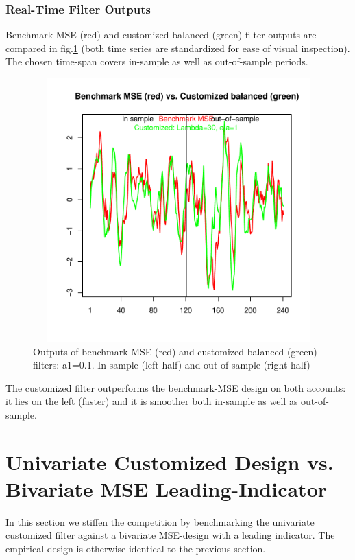 \documentclass[a4paper]{book}
\begin{document}
\subsubsection{Real-Time Filter Outputs}


Benchmark-MSE (red) and customized-balanced (green) filter-outputs are compared in fig.\ref{z_dfa_cust_ats_mba_per_e} (both time series are standardized for ease of visual inspection). The chosen time-span covers in-sample as well as out-of-sample periods. 

\begin{figure}[H]\begin{center}\includegraphics[height=4in, width=6in]{z_dfa_cust_ats_mba_per_e}\caption{Outputs of benchmark MSE (red) and customized balanced (green) filters: a1=0.1. In-sample (left half) and out-of-sample (right half)\label{z_dfa_cust_ats_mba_per_e}}\end{center}\end{figure}The customized filter outperforms the benchmark-MSE design on both accounts: it lies on the left (faster) and it is smoother both in-sample as well as out-of-sample. 







\section{Univariate Customized Design vs. Bivariate MSE Leading-Indicator}\label{ucdvbmseli}

In this section we stiffen the competition by benchmarking the univariate customized filter against a bivariate MSE-design with a leading indicator. The empirical design is otherwise identical to the previous section. 
\end{document}
